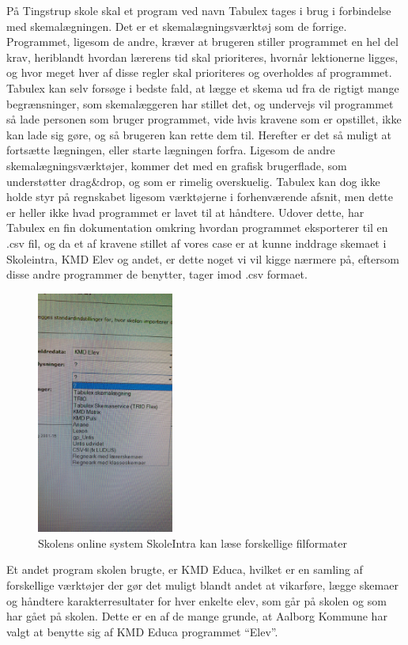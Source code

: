 På Tingstrup skole skal et program ved navn Tabulex tages i brug i forbindelse med skemalægningen. Det er et skemalægningsværktøj som de forrige. Programmet, ligesom de andre, kræver at brugeren stiller programmet en hel del krav, heriblandt hvordan lærerens tid skal prioriteres, hvornår lektionerne ligges, og hvor meget hver af disse regler skal prioriteres og overholdes af programmet\cite{Tabulex}. Tabulex kan selv forsøge i bedste fald, at lægge et skema ud fra de rigtigt mange begrænsninger, som skemalæggeren har stillet det, og undervejs vil programmet så lade personen som bruger programmet, vide hvis kravene som er opstillet, ikke kan lade sig gøre, og så brugeren kan rette dem til. Herefter er det så muligt at fortsætte lægningen, eller starte lægningen forfra. Ligesom de andre skemalægningsværktøjer, kommer det med en grafisk brugerflade, som understøtter drag\&drop, og som er rimelig overskuelig. Tabulex kan dog ikke holde styr på regnskabet ligesom værktøjerne i forhenværende afsnit, men dette er heller ikke hvad programmet er lavet til at håndtere. Udover dette, har Tabulex en fin dokumentation omkring hvordan programmet eksporterer til en .csv fil\cite{Tabulex_csv}, og da et af kravene stillet af vores case er at kunne inddrage skemaet i Skoleintra, KMD Elev og andet\cite{Interview_Kaerby}, er dette noget vi vil kigge nærmere på, eftersom disse andre programmer de benytter, tager imod .csv formaet.
\begin{figure}[h!]
	\centering
	\includegraphics[width=0.4\textwidth]{../Billeder/Skemaimportering_filtyper_Intra.jpg}
	\caption{Skolens online system SkoleIntra kan læse forskellige filformater}
	\label{fig:kompatibleFiltyper}
\end{figure}
\FloatBarrier
Et andet program skolen brugte, er KMD Educa, hvilket er en samling af forskellige værktøjer\cite{KMD} der gør det muligt blandt andet at vikarføre, lægge skemaer og håndtere karakterresultater for hver enkelte elev, som går på skolen og som har gået på skolen. Dette er en af de mange grunde, at Aalborg Kommune har valgt at benytte sig af KMD Educa programmet ``Elev''\cite{useCase_KMD_Educa_Elev}.

